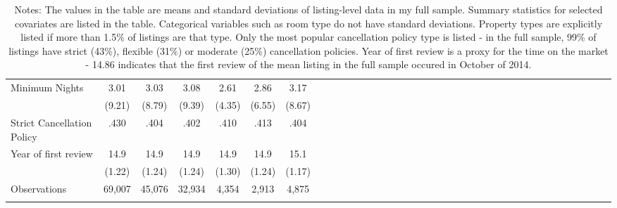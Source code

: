 {\begin{longtable}{l*{6}{c|c|cccc}}
Minimum Nights   &   3.01  &      3.03		&      3.08 &      2.61  &      2.86  	& 	3.17\\
							&  (9.21)  & (8.79)     &     (9.39)         &     (4.35)         &     (6.55)         &     (8.67)         \\
Strict Cancellation Policy   &   .430  &      .404		&      .402 &      .410  &      .413  	& 	.404\\
[1em]
Year of first review    & 14.9   &      14.9	&      14.9  &      14.9		&    14.9 		&	 15.1\\
							& (1.22)    &     (1.24)         &     (1.24)         &     (1.30)         &     (1.24)         & (1.17)\\

\hline
Observations  & 69,007  & 45,076   &       32,934         &       4,354         &       2,913   & 4,875      \\
\hline\hline
\caption*{Notes: The values in the table are means and standard deviations of listing-level data in my full sample. Summary statistics for selected covariates are listed in the table. Categorical variables such as room type do not have standard deviations. Property types are explicitly listed if more than 1.5\% of listings are that type. Only the most popular cancellation policy type is listed - in the full sample, 99\% of listings have strict (43\%), flexible (31\%) or moderate (25\%) cancellation policies. Year of first review is a proxy for the time on the market - 14.86 indicates that the first review of the mean listing in the full sample occured in October of 2014.}

\end{longtable}
}
\normalsize



